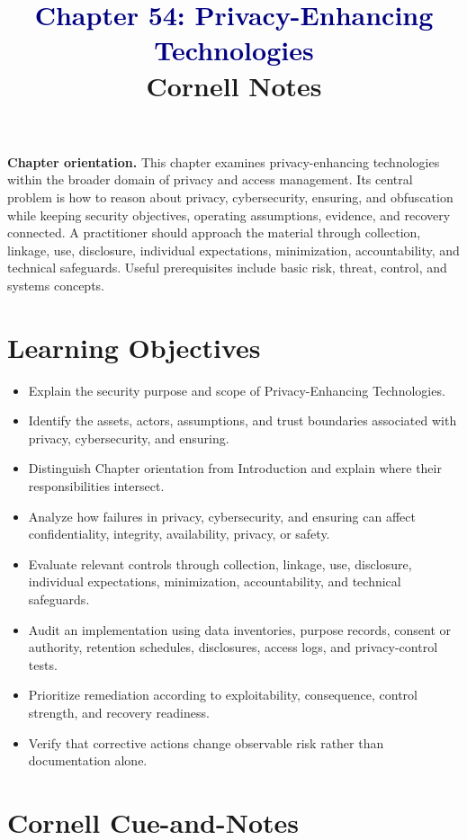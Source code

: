 \documentclass[11pt]{article}
\title{\textcolor{Navy}{Chapter 54: Privacy-Enhancing Technologies}\\[2mm]\large Cornell Notes}
\author{}
\date{}
\begin{document}
\maketitle
\thispagestyle{fancy}
\vspace{-1.5em}
\begin{orientationbox}
\textbf{Chapter orientation.} This chapter examines privacy-enhancing technologies within the broader domain of privacy and access management. Its central problem is how to reason about privacy, cybersecurity, ensuring, and obfuscation while keeping security objectives, operating assumptions, evidence, and recovery connected. A practitioner should approach the material through collection, linkage, use, disclosure, individual expectations, minimization, accountability, and technical safeguards. Useful prerequisites include basic risk, threat, control, and systems concepts.
\end{orientationbox}
\section*{Learning Objectives}
\begin{itemize}
\item Explain the security purpose and scope of Privacy-Enhancing Technologies.
\item Identify the assets, actors, assumptions, and trust boundaries associated with privacy, cybersecurity, and ensuring.
\item Distinguish Chapter orientation from Introduction and explain where their responsibilities intersect.
\item Analyze how failures in privacy, cybersecurity, and ensuring can affect confidentiality, integrity, availability, privacy, or safety.
\item Evaluate relevant controls through collection, linkage, use, disclosure, individual expectations, minimization, accountability, and technical safeguards.
\item Audit an implementation using data inventories, purpose records, consent or authority, retention schedules, disclosures, access logs, and privacy-control tests.
\item Prioritize remediation according to exploitability, consequence, control strength, and recovery readiness.
\item Verify that corrective actions change observable risk rather than documentation alone.
\end{itemize}
\section*{Cornell Cue-and-Notes}
\end{document}
